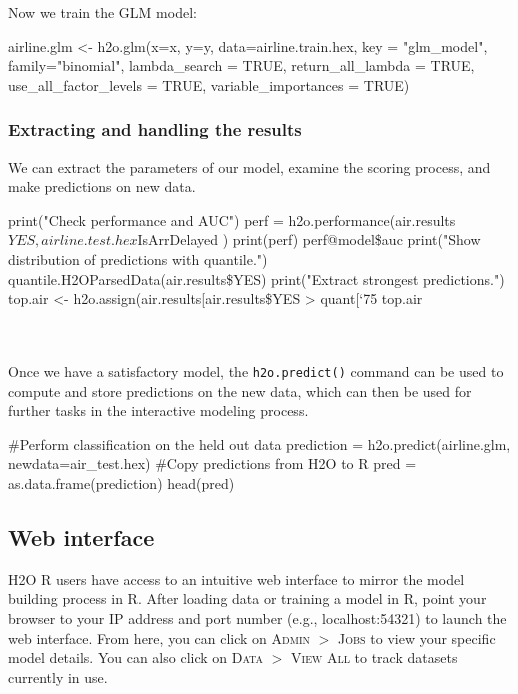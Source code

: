 \documentclass[11pt]{article}
\begin{document}
Now we train the GLM model:

\begin{spverbatim}
airline.glm <- h2o.glm(x=x, 
                     y=y, 
                     data=airline.train.hex,
                     key = "glm_model",
                     family="binomial",
                     lambda_search = TRUE,
                     return_all_lambda = TRUE,
                     use_all_factor_levels = TRUE,
                     variable_importances = TRUE)
\end{spverbatim}

\subsubsection{Extracting and handling the results} \label{3.2.1}

We can extract the parameters of our model, examine the scoring process, and make predictions on new data.

\begin{spverbatim}
print("Check performance and AUC")
perf = h2o.performance(air.results$YES,airline.test.hex$IsArrDelayed )
print(perf)
perf@model\$auc
print("Show distribution of predictions with quantile.")
quantile.H2OParsedData(air.results\$YES)  
print("Extract strongest predictions.")
top.air <- h2o.assign(air.results[air.results\$YES > quant[‘75%
top.air
\end{spverbatim}
\noindent
\\
\\
Once we have a satisfactory model, the \texttt{h2o.predict()} command can be used to compute and store predictions on the new data, which can then be used for further tasks in the interactive modeling process.
\begin{spverbatim}
#Perform classification on the held out data
prediction = h2o.predict(airline.glm, newdata=air_test.hex)
#Copy predictions from H2O to R
pred = as.data.frame(prediction)
head(pred)
\end{spverbatim}
\subsection{Web interface} \label{3.3}
H2O R users have access to an intuitive web interface to mirror the model building process in R. After loading data or training a model in R, point your browser to your IP address and port number (e.g., localhost:54321) to launch the web interface. From here, you can click on \textsc{Admin} $>$ \textsc{Jobs} to view your specific model details. You can also click on \textsc{Data} $>$ \textsc{View All} to track datasets currently in use. 
\end{document}
